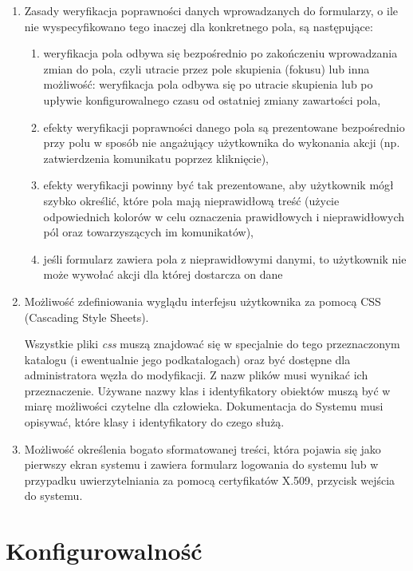 \documentclass[a4paper]{report}
\begin{document}
\begin{enumerate}
  \item Zasady weryfikacja poprawności danych wprowadzanych do formularzy, o ile
  nie wyspecyfikowano tego inaczej dla konkretnego pola, są następujące:
  \begin{enumerate}
    \item weryfikacja pola odbywa się bezpośrednio po zakończeniu wprowadzania zmian do pola, czyli utracie przez pole skupienia (fokusu)
    lub inna możliwość: weryfikacja pola odbywa się po utracie skupienia lub po upływie konfigurowalnego czasu od ostatniej zmiany zawartości pola,
    \item efekty weryfikacji poprawności danego pola są prezentowane bezpośrednio przy polu w sposób nie angażujący użytkownika do wykonania
    akcji (np. zatwierdzenia komunikatu poprzez kliknięcie),
    \item efekty weryfikacji powinny być tak prezentowane, aby użytkownik mógł szybko określić, które pola mają
    nieprawidłową treść (użycie odpowiednich kolorów w celu oznaczenia prawidłowych i nieprawidłowych pól oraz towarzyszących
    im komunikatów),
    \item jeśli formularz zawiera pola z nieprawidłowymi danymi, to użytkownik nie może wywołać akcji dla której dostarcza on dane
  \end{enumerate}

  \item Możliwość zdefiniowania wyglądu interfejsu użytkownika za pomocą CSS (Cascading Style Sheets).

  Wszystkie pliki \emph{css} muszą znajdować się w specjalnie do tego przeznaczonym katalogu (i ewentualnie
  jego podkatalogach) oraz być dostępne dla administratora węzła do modyfikacji. Z nazw plików musi wynikać
  ich przeznaczenie. Używane nazwy klas i identyfikatory obiektów muszą być w miarę możliwości czytelne
  dla człowieka. Dokumentacja do Systemu musi opisywać, które klasy i identyfikatory do czego służą.

  \item Możliwość określenia bogato sformatowanej treści, która pojawia się jako pierwszy ekran systemu
  i zawiera formularz logowania do systemu lub w przypadku uwierzytelniania za pomocą certyfikatów X.509,
  przycisk wejścia do systemu.

\end{enumerate}

\section{Konfigurowalność}
\end{document}
